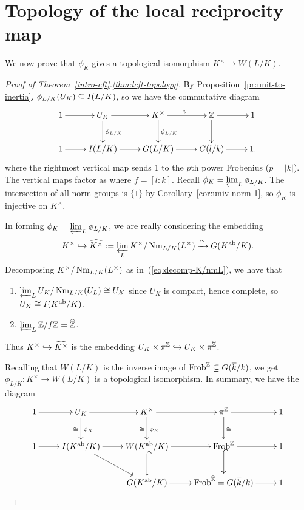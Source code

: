 \section{Topology of the local reciprocity map}
We now prove that $\phi_K$ gives a topological isomorphism $K^{\times}\to W(L/K)$.
\begin{proof}[Proof of Theorem~\ref{intro-cft}.\ref{thm:lcft-topology}]
By Proposition~\ref{pr:unit-to-inertia}, $\phi_{L/K}(U_K)\subseteq I(L/K)$, so we have the commutative diagram
\[
\xymatrix{
1\ar[r] & U_K \ar[r]\ar[d]^{\phi_{L/K}} & K^{\times}\ar[r]^v\ar[d]^{\phi_{L/K}} & \Z\ar[r]\ar[d] & 1\\
1\ar[r] & I(L/K) \ar[r] & G(L/K) \ar[r] & G(l/k)\ar[r] & 1.
}
\]
where the rightmost vertical map sends 1 to the $p$th power Frobenius ($p=|k|$). The vertical maps factor as
\eeq
where $f=[l:k]$. Recall $\phi_K=\varprojlim_L \phi_{L/K}$.  The intersection of all norm groups is $\{1\}$ by Corollary~\ref{cor:univ-norm-1}, so $\phi_K$ is injective on $K^{\times}$. 

In forming $\phi_K=\varprojlim_L \phi_{L/K}$, we are really considering the embedding
\[
K^{\times}\hookrightarrow \widehat{K^{\times}}:=\varprojlim_L K^{\times}/\operatorname{Nm}_{L/K}(L^{\times})\xrightarrow{\cong} G(K^{\text{ab}}/K).
\] 
Decomposing $K^{\times}/\operatorname{Nm}_{L/K}(L^{\times})$ as in~(\ref{eq:decomp-K/nmL}), we have that 
\begin{enumerate}
\item
$\varprojlim_L U_K/\operatorname{Nm}_{L/K}(U_L)\cong U_K$ since $U_K$ is compact, hence complete, so $U_K\cong I(K^{\text{ab}}/K)$. 
\item
$\varprojlim_L \mathbb{Z}/f\mathbb{Z}=\widehat{\mathbb{Z}}$.
\end{enumerate}
Thus $K^{\times}\hookrightarrow \widehat{K^{\times}}$ is the embedding $U_K\times \pi^{\mathbb{Z}}\hookrightarrow U_K\times \pi^{\widehat{\mathbb{Z}}}$.

Recalling that $W(L/K)$ is the inverse image of $\operatorname{Frob}^{\mathbb{Z}}\subseteq G(\overline{k}/k)$, we get $\phi_{L/K}:K^{\times}\to W(L/K)$ is a topological isomorphism. In summary, we have the diagram
\[
\xymatrix{
1\ar[r]& U_K\ar[r]\ar[d]^{\phi_K}_{\cong}& K^{\times}\ar[r]\ar[d]^{\phi_K}_{\cong}& \pi^{\Z}\ar[r]\ar[d]^{\cong} &1\\
1\ar[r]& I(K\abe/K)\ar[r]\ar[rd]&W(K\abe/K) \ar[r]\ar@{^(->}[d]& \Frob^{\Z} \ar[r]\ar@{^(->}[d]& 1\\
&&G(K\abe/K)\ar[r] &\Frob^{\wh{\Z}}=G(\ol k/k)\ar[r] &1
}
\]
\end{proof}
